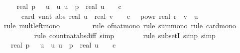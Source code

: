 \begin{isabellebody}
\ \isamarkupfalse%
\ {\isachardoublequoteopen}{\isachardot}{\kern0pt}{\isachardot}{\kern0pt}{\isachardot}{\kern0pt}\ {\isasymle}\ {}{\isacharslash}{\kern0pt}{\isacharparenleft}{\kern0pt}real\ p{\isacharparenright}{\kern0pt}\ {\isacharasterisk}{\kern0pt}\ {\isacharparenleft}{\kern0pt}{\isasymSum}\ u{\isacharprime}{\kern0pt}\ {\isasymin}\ {\isacharbraceleft}{\kern0pt}u{\isachardot}{\kern0pt}\ u\ {\isacharless}{\kern0pt}\ p\ {\isasymand}\ real\ u\ {\isasymle}\ {}\ {\isacharasterisk}{\kern0pt}\ c{\isacharbraceright}{\kern0pt}{\isachardot}{\kern0pt}\isanewline
\ \ \ \ \ \ card\ {\isacharbraceleft}{\kern0pt}{\isacharparenleft}{\kern0pt}v{\isacharcolon}{\kern0pt}{\isacharcolon}{\kern0pt}nat{\isacharparenright}{\kern0pt}{\isachardot}{\kern0pt}\ abs\ {\isacharparenleft}{\kern0pt}real\ u{\isacharprime}{\kern0pt}\ {\isacharminus}{\kern0pt}\ real\ v{\isacharparenright}{\kern0pt}\ {\isasymle}\ {}\ {\isacharasterisk}{\kern0pt}\ c\ {\isacharasterisk}{\kern0pt}\ {}\ powr\ {\isacharparenleft}{\kern0pt}{\isacharminus}{\kern0pt}real\ r{\isacharparenright}{\kern0pt}\ {\isasymand}\ v\ {\isasymnoteq}\ u{\isacharprime}{\kern0pt}{\isacharbraceright}{\kern0pt}{\isacharparenright}{\kern0pt}{\isachardoublequoteclose}\isanewline
\ \ \ \ \ \ \isamarkupfalse%
\ {\isacharparenleft}{\kern0pt}rule\ mult{\isacharunderscore}{\kern0pt}left{\isacharunderscore}{\kern0pt}mono{\isacharparenright}{\kern0pt}\isanewline
\ \ \ \ \ \ \ \isamarkupfalse%
\ {\isacharparenleft}{\kern0pt}rule\ of{\isacharunderscore}{\kern0pt}nat{\isacharunderscore}{\kern0pt}mono{\isacharcomma}{\kern0pt}\ rule\ sum{\isacharunderscore}{\kern0pt}mono{\isacharcomma}{\kern0pt}\ rule\ card{\isacharunderscore}{\kern0pt}mono{\isacharparenright}{\kern0pt}\isanewline
\ \ \ \ \ \ \ \ \isamarkupfalse%
\ {\isacharparenleft}{\kern0pt}rule\ count{\isacharunderscore}{\kern0pt}nat{\isacharunderscore}{\kern0pt}abs{\isacharunderscore}{\kern0pt}diff{\isacharunderscore}{\kern0pt}{}{\isacharparenleft}{\kern0pt}{}{\isacharparenright}{\kern0pt}{\isacharcomma}{\kern0pt}\ simp{\isacharparenright}{\kern0pt}\isanewline
\ \ \ \ \ \ \isamarkupfalse%
\ {\isacharparenleft}{\kern0pt}rule\ subsetI{\isacharcomma}{\kern0pt}\ simp{\isacharcomma}{\kern0pt}\ simp{\isacharparenright}{\kern0pt}\isanewline
\ \ \ \ \isamarkupfalse%
\ \isamarkupfalse%
\ {\isachardoublequoteopen}{\isachardot}{\kern0pt}{\isachardot}{\kern0pt}{\isachardot}{\kern0pt}\ {\isasymle}\ {}{\isacharslash}{\kern0pt}{\isacharparenleft}{\kern0pt}real\ p{\isacharparenright}{\kern0pt}\ {\isacharasterisk}{\kern0pt}\ {\isacharparenleft}{\kern0pt}{\isasymSum}\ u{\isacharprime}{\kern0pt}\ {\isasymin}\ {\isacharbraceleft}{\kern0pt}u{\isachardot}{\kern0pt}\ u\ {\isacharless}{\kern0pt}\ p\ {\isasymand}\ real\ u\ {\isasymle}\ {}\ {\isacharasterisk}{\kern0pt}\ c{\isacharbraceright}{\kern0pt}{\isachardot}{\kern0pt}\isanewline

\end{isabellebody}
